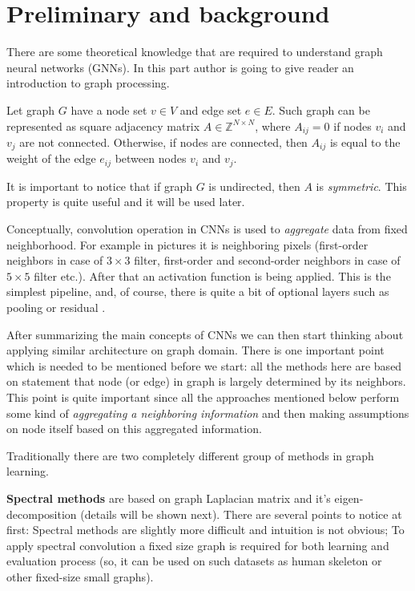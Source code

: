 \chapter{Preliminary and background}

There are some theoretical knowledge that are required to understand graph neural networks (GNNs). In this part author is going to give reader an introduction to graph processing.

Let graph $G$ have a node set $v\in V$ and edge set $e\in E$. Such graph can be represented as square adjacency matrix $A\in \mathbb{Z}^{N\times N}$, where $A_{ij}=0$ if nodes $v_i$ and $v_j$ are not connected. Otherwise, if nodes are connected, then $A_{ij}$ is equal to the weight of the edge $e_{ij}$ between nodes $v_i$ and $v_j$.

It is important to notice that if graph $G$ is undirected, then $A$ is \textit{symmetric}. This property is quite useful and it will be used later.

Conceptually, convolution operation in CNNs is used to \textit{aggregate} data from fixed neighborhood. For example in pictures it is neighboring pixels (first-order neighbors in case of $3\times 3$ filter, first-order and second-order neighbors in case of $5\times 5$ filter etc.). After that an activation function is being applied. This is the simplest pipeline, and, of course, there is quite a bit of optional layers such as pooling or residual \cite{He_Zhang_Ren_Sun_2015}.

After summarizing the main concepts of CNNs we can then start thinking about applying similar architecture on graph domain. There is one important point which is needed to be mentioned before we start: all the methods here are based on statement that node (or edge) in graph is largely determined by its neighbors. This point is quite important since all the approaches mentioned below perform some kind of \textit{aggregating a neighboring information} and then making assumptions on node itself based on this aggregated information.

Traditionally there are two completely different group of methods in graph learning.

\textbf{Spectral methods} are based on graph Laplacian matrix and it's eigen-decomposition (details will be shown next). There are several points to notice at first: Spectral methods are slightly more difficult and intuition is not obvious; To apply spectral convolution a fixed size graph is required for both learning and evaluation process (so, it can be used on such datasets as human skeleton or other fixed-size small graphs).

